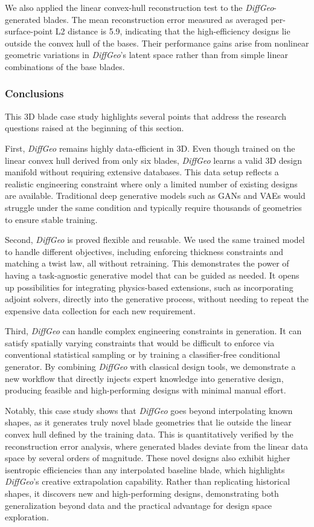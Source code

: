 We also applied the linear convex-hull reconstruction test to the \textit{DiffGeo}-generated blades. The mean reconstruction error measured as averaged per-surface-point L2 distance is 5.9, indicating that the high-efficiency designs lie outside the convex hull of the bases. Their performance gains arise from nonlinear geometric variations in \textit{DiffGeo}’s latent space rather than from simple linear combinations of the base blades.

\subsubsection{Conclusions}
This 3D blade case study highlights several points that address the research questions raised at the beginning of this section.

First, \textit{DiffGeo} remains highly data-efficient in 3D. Even though trained on the linear convex hull derived from only six blades, \textit{DiffGeo} learns a valid 3D design manifold without requiring extensive databases. This data setup reflects a realistic engineering constraint where only a limited number of existing designs are available. Traditional deep generative models such as GANs and VAEs would struggle under the same condition and typically require thousands of geometries to ensure stable training.

Second, \textit{DiffGeo} is proved flexible and reusable. We used the same trained model to handle different objectives, including enforcing thickness constraints and matching a twist law, all without retraining. This demonstrates the power of having a task-agnostic generative model that can be guided as needed. It opens up possibilities for integrating physics-based extensions, such as incorporating adjoint solvers, directly into the generative process, without needing to repeat the expensive data collection for each new requirement.

Third, \textit{DiffGeo} can handle complex engineering constraints in generation. It can satisfy spatially varying constraints that would be difficult to enforce via conventional statistical sampling or by training a classifier-free conditional generator. By combining \textit{DiffGeo} with classical design tools, we demonstrate a new workflow that directly injects expert knowledge into generative design, producing feasible and high-performing designs with minimal manual effort. 

Notably, this case study shows that \textit{DiffGeo} goes beyond interpolating known shapes, as it generates truly novel blade geometries that lie outside the linear convex hull defined by the training data. This is quantitatively verified by the reconstruction error analysis, where generated blades deviate from the linear data space by several orders of magnitude. These novel designs also exhibit higher isentropic efficiencies than any interpolated baseline blade, which highlights \textit{DiffGeo}’s creative extrapolation capability. Rather than replicating historical shapes, it discovers new and high-performing designs, demonstrating both generalization beyond data and the practical advantage for design space exploration.